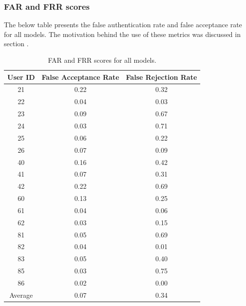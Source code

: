 
\subsubsection{FAR and FRR scores}
The below table presents the false authentication rate and false acceptance rate for all models. The motivation behind the use of these metrics was discussed in section .

\begin{center}
\begin{table}
\begin{center}
	\begin{tabular}{ |c|c|c| } 
		\hline
		User ID & False Acceptance Rate & False Rejection Rate \\
		\hline
		21 & 0.22 & 0.32 \\
		\hline
		22 & 0.04 & 0.03 \\
		\hline
		23 & 0.09 & 0.67 \\
		\hline
		24 & 0.03 & 0.71 \\
		\hline
		25 & 0.06 & 0.22 \\
		\hline
		26 & 0.07 & 0.09 \\
		\hline
		40 & 0.16 & 0.42 \\
		\hline
		41 & 0.07 & 0.31 \\
		\hline
		42 & 0.22 & 0.69 \\
		\hline
		60 & 0.13 & 0.25 \\
		\hline
		61 & 0.04 & 0.06 \\
		\hline
		62 & 0.03 & 0.15 \\
		\hline
		81 & 0.05 & 0.69 \\
		\hline
		82 & 0.04 & 0.01 \\
		\hline
		83 & 0.05 & 0.40 \\
		\hline
		85 & 0.03 & 0.75 \\
		\hline
		86 & 0.02 & 0.00 \\
		\hline
		\hline
		Average & 0.07 & 0.34 \\
		\hline
	\end{tabular}
\end{center}
\caption{FAR and FRR scores for all models.}
\label{table:FAR_FRR_base}
\end{table}
\end{center}

